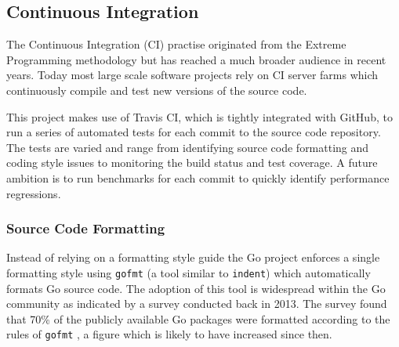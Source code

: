 


\subsection{Continuous Integration}


The Continuous Integration (CI) practise originated from the Extreme Programming methodology \cite{xp} but has reached a much broader audience in recent years. Today most large scale software projects rely on CI server farms which continuously compile and test new versions of the source code.

This project makes use of Travis CI, which is tightly integrated with GitHub, to run a series of automated tests for each commit to the source code repository. The tests are varied and range from identifying source code formatting and coding style issues to monitoring the build status and test coverage. A future ambition is to run benchmarks for each commit to quickly identify performance regressions.

\subsubsection{Source Code Formatting}

Instead of relying on a formatting style guide the Go project enforces a single formatting style using \texttt{gofmt} (a tool similar to \texttt{indent}) which automatically formats Go source code. The adoption of this tool is widespread within the Go community as indicated by a survey conducted back in 2013. The survey found that 70\% of the publicly available Go packages were formatted according to the rules of \texttt{gofmt} \cite{gofmt_70percent}, a figure which is likely to have increased since then.

